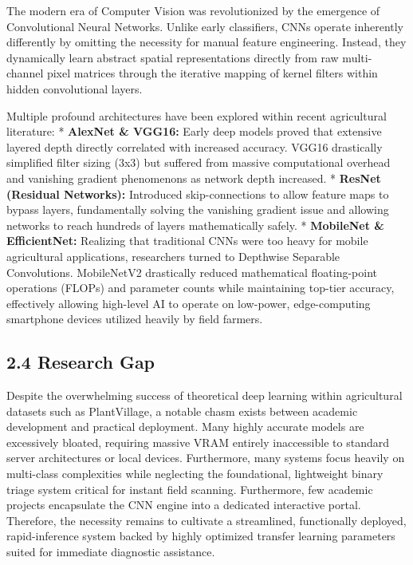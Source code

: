 \documentclass[
]{article}
\begin{document}
The modern era of Computer Vision was revolutionized by the emergence of
Convolutional Neural Networks. Unlike early classifiers, CNNs operate
inherently differently by omitting the necessity for manual feature
engineering. Instead, they dynamically learn abstract spatial
representations directly from raw multi-channel pixel matrices through
the iterative mapping of kernel filters within hidden convolutional
layers.

Multiple profound architectures have been explored within recent
agricultural literature: * \textbf{AlexNet \& VGG16:} Early deep models
proved that extensive layered depth directly correlated with increased
accuracy. VGG16 drastically simplified filter sizing (3x3) but suffered
from massive computational overhead and vanishing gradient phenomenons
as network depth increased. * \textbf{ResNet (Residual Networks):}
Introduced skip-connections to allow feature maps to bypass layers,
fundamentally solving the vanishing gradient issue and allowing networks
to reach hundreds of layers mathematically safely. * \textbf{MobileNet
\& EfficientNet:} Realizing that traditional CNNs were too heavy for
mobile agricultural applications, researchers turned to Depthwise
Separable Convolutions. MobileNetV2 drastically reduced mathematical
floating-point operations (FLOPs) and parameter counts while maintaining
top-tier accuracy, effectively allowing high-level AI to operate on
low-power, edge-computing smartphone devices utilized heavily by field
farmers.

\subsection{2.4 Research Gap}\label{research-gap}

Despite the overwhelming success of theoretical deep learning within
agricultural datasets such as PlantVillage, a notable chasm exists
between academic development and practical deployment. Many highly
accurate models are excessively bloated, requiring massive VRAM entirely
inaccessible to standard server architectures or local devices.
Furthermore, many systems focus heavily on multi-class complexities
while neglecting the foundational, lightweight binary triage system
critical for instant field scanning. Furthermore, few academic projects
encapsulate the CNN engine into a dedicated interactive portal.
Therefore, the necessity remains to cultivate a streamlined,
functionally deployed, rapid-inference system backed by highly optimized
transfer learning parameters suited for immediate diagnostic assistance.
\end{document}
